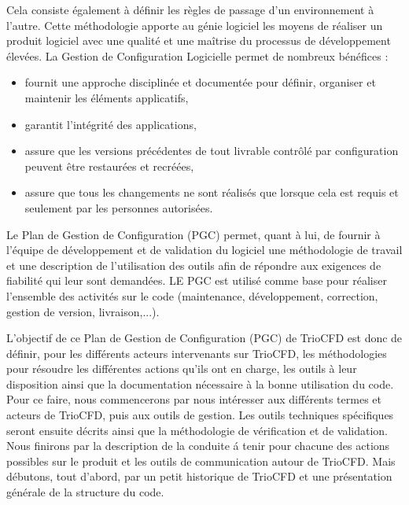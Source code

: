 Cela consiste \'egalement \`a d\'efinir les r\`egles de passage d'un environnement \`a l'autre. Cette m\'ethodologie apporte au g\'enie logiciel les moyens de r\'ealiser un produit logiciel avec une qualit\'e et une ma\^itrise du processus de d\'eveloppement \'elev\'ees.\smallskip\newline
La Gestion de Configuration Logicielle permet de nombreux b\'en\'efices :
\begin{itemize}
	\item fournit une approche disciplinée et documentée pour d\'efinir, organiser et maintenir les \'el\'ements applicatifs,
	\item garantit l'int\'egrit\'e des applications,
	\item assure que les versions pr\'ec\'edentes de tout livrable contr\^ol\'e par configuration peuvent \^etre restaur\'ees et recr\'e\'ees,
	\item assure que tous les changements ne sont r\'ealis\'es que lorsque cela est requis et seulement par les personnes autoris\'ees.
\end{itemize}

Le Plan de Gestion de Configuration (PGC) permet, quant \`a lui, de fournir \`a l'\'equipe de d\'eveloppement et de validation du logiciel une m\'ethodologie de travail et une description de l'utilisation des  outils afin de r\'epondre aux exigences de fiabilit\'e qui leur sont demand\'ees. LE PGC est utilis\'e comme base pour r\'ealiser l'ensemble des activit\'es sur le code (maintenance, d\'eveloppement, correction, gestion de version, livraison,...).\smallskip\newline

L'objectif de ce Plan de Gestion de Configuration (PGC) de TrioCFD est donc de d\'efinir, pour les diff\'erents acteurs intervenants sur TrioCFD, les m\'ethodologies pour r\'esoudre les diff\'erentes actions qu'ils ont en charge, les outils \`a leur disposition ainsi que la documentation n\'ecessaire \`a la bonne utilisation du code.\smallskip\newline
Pour ce faire, nous commencerons par nous int\'eresser aux diff\'erents termes et acteurs de TrioCFD, puis aux outils de gestion. Les outils techniques sp\'ecifiques seront ensuite d\'ecrits ainsi que la m\'ethodologie de v\'erification et de validation. Nous finirons par la description de la conduite \'a tenir pour chacune des actions possibles sur le produit et les outils de communication autour de TrioCFD. Mais d\'ebutons, tout d'abord, par un petit historique de TrioCFD et une pr\'esentation g\'en\'erale de la structure du code.

